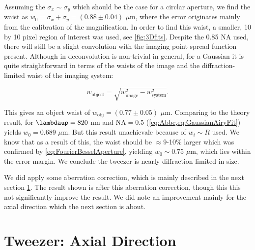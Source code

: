 Assuming the $\sigma_x \sim \sigma_y$ which should be the case for a circlar aperture, we find the waist as $w_0 = \sigma_x + \sigma_y = (0.88 \pm 0.04)$ $\mu$m, where the error originates mainly from the calibration of the magnification. 
In order to find this waist, a smaller, 10 by 10 pixel region of interest was used, see \cref{fig:3Dfits}.
Despite the 0.85 NA used, there will still be a slight convolution with the imaging point spread function present. 
Although in deconvolution is non-trivial in general, for a Gaussian it is quite straightforward \cite{Knottnerus2018} in terms of the waists of the image and the diffraction-limited waist of the imaging system:

\begin{equation}\label{eq:Deconvolution}
    w_{\text{object}} = \sqrt{w_{\text{image}}^2-w_{\text{system}}^2}.
\end{equation}

This gives an object waist of $w_{\text{obj}} = (0.77 \pm 0.05)$ $\mu$m. 
Comparing to the theory result, for $\lambdaup = 820$ nm and $\text{NA} = 0.5$ (\cref{eq:Abbe,eq:GaussianAiryFit}) yields $w_0 = 0.689$ $\mu$m. 
But this result unachievale because of $w_i \sim R$ used. 
We know that as a result of this, the waist should be $\approx$9-10\% larger \cite{Sortais2007,Chon2007} which was confirmed by \cref{eq:FourierBesselAperture}, yielding $w_0 \sim 0.75$ $\mu$m, which lies within the error margin.
We conclude the tweezer is nearly diffraction-limited in size.

We did apply some aberration correction, which is mainly described in the next section \cref{sec:Tweezer3D}.
The result shown is after this aberration correction, though this this not significantly improve the result. 
We did note an improvement mainly for the axial direction which the next section is about. 


\section{Tweezer: Axial Direction}\label{sec:Tweezer3D}


